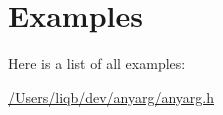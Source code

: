 \section{Examples}
Here is a list of all examples\-:\begin{DoxyCompactItemize}
\item 
\hyperlink{_2_users_2liqb_2dev_2anyarg_2anyarg_8h-example}{/\-Users/liqb/dev/anyarg/anyarg.\-h}
\end{DoxyCompactItemize}
